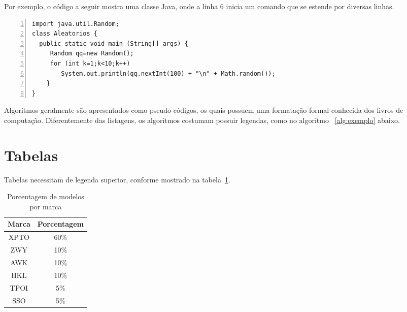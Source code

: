 \documentclass[a4paper,12pt]{monografia}
\theoremstyle{plain}
\theoremstyle{definition}
\theoremstyle{remark}
\begin{document}
Por exemplo, o c\'odigo a seguir mostra uma classe Java, onde a linha 6 inicia um comando que se estende por diversas linhas. 


\lstset{tabsize=5,language=C,showstringspaces=false,basicstyle=\ttfamily\small,keywordstyle=\bf,breaklines=true}
\begin{singlespacing}
\begin{lstlisting}[frame=single,framexrightmargin=1pt,numbers=left]
import java.util.Random;
class Aleatorios {
  public static void main (String[] args) {
     Random qq=new Random();
     for (int k=1;k<10;k++)
        System.out.println(qq.nextInt(100) + "\n" + Math.random());
    }
}
\end{lstlisting}
\end{singlespacing}

 Algoritmos geralmente s\~ao apresentados como pseudo-c\'odigos, os quais possuem uma formata\c{c}\~ao formal conhecida dos livros de computa\c{c}\~ao. Diferentemente das listagens, os algoritmos costumam possuir legendas, como no algoritmo ~\ref{alg:exemplo} abaixo.

\begin{algorithm}
\label{alg:exemplo}
 \caption{Ler n\'umero e imprimir se \'e par ou n\~ao.}

\end{algorithm}


\section{Tabelas}

Tabelas necessitam de legenda superior, conforme mostrado na tabela~\ref{tab:modelos}.

\begin{table}[ht]
   \centering
   \caption{Porcentagem de modelos por marca}
   \label{tab:modelos}
   \begin{tabular}{| c | c |}
      \hline 
      Marca & Porcentagem \\
      \hline \hline 
      XPTO & 60\% \\
      \hline
      ZWY & 10\% \\
      \hline
      AWK & 10\% \\
      \hline
      HKL & 10\% \\
      \hline
      TPOI & 5\% \\
      \hline
      SSO & 5\% \\
      \hline
   \end{tabular} 
\end{table}
\end{document}
